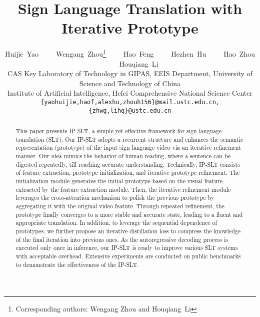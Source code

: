 \documentclass[10pt,twocolumn,letterpaper]{article}
\begin{document}
\title{Sign Language Translation with Iterative Prototype}

\author{Huijie~Yao~~~~~Wengang~Zhou\thanks{Corresponding authors: Wengang Zhou and Houqiang~Li}~~~~~Hao~Feng~~~~~Hezhen~Hu~~~~~Hao~Zhou~~~~~Houqiang~Li\footnotemark[1] \\
{\normalsize  CAS Key Laboratory of Technology in GIPAS, EEIS Department, University of Science and Technology of China} \\
{\normalsize  Institute of Artificial Intelligence, Hefei Comprehensive National Science Center} \\
{\tt\small \{yaohuijie,haof,alexhu,zhouh156\}@mail.ustc.edu.cn, \{zhwg,lihq\}@ustc.edu.cn}
}


\maketitle

\ificcvfinal\thispagestyle{empty}\fi

\begin{abstract}
This paper presents IP-SLT, a simple yet effective framework for sign language translation (SLT). Our IP-SLT adopts a recurrent structure and enhances the semantic representation (prototype) of the input sign language video via an iterative refinement manner. Our idea mimics the behavior of human reading, where a sentence can be digested repeatedly, till reaching accurate understanding. Technically, IP-SLT consists of feature extraction, prototype initialization, and iterative prototype refinement. The initialization module generates the initial prototype based on the visual feature extracted by the feature extraction module. Then, the iterative refinement module leverages the cross-attention mechanism to polish the previous prototype by aggregating it with the original video feature. Through repeated refinement, the prototype finally converges to a more stable and accurate state, leading to a fluent and appropriate translation. In addition, to leverage the sequential dependence of prototypes, we further propose an iterative distillation loss to compress the knowledge of the final iteration into previous ones. As the autoregressive decoding process is executed only once in inference, our IP-SLT is ready to improve various SLT systems with acceptable overhead. Extensive experiments are conducted on public benchmarks to demonstrate the effectiveness of the IP-SLT.
\end{abstract}
\end{document}
